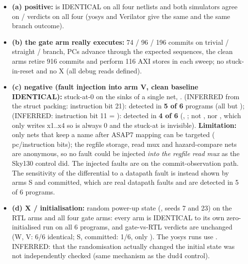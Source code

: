 \begin{record}

\begin{itemize}
\tightlist
\item
  \textbf{(a) positive:}  is IDENTICAL on all four
  netlists and both simulators agree on
  / verdicts on all four (yosys
   and Verilator give the same  and the same branch
  outcome).
\item
  \textbf{(b) the gate arm really executes:} 74 / 96 / 196 commits on
  trivial / straight / branch, PCs advance through the expected
  sequences, the clean arms retire 916 commits and perform 116 AXI
  stores in each sweep; no stuck-in-reset and no X (all debug reads
  defined).
\item
  \textbf{(c) negative (fault injection into arm V, clean baseline
  IDENTICAL):} stuck-at-0 on the sinks of a single net,
  .  (INFERRED
  from the struct packing: instruction bit 21): detected in \textbf{5 of
  6} programs (all but ); 
  (INFERRED: instruction bit 11 = ): detected in \textbf{4
  of 6} (, ; not , nor
  , which only writes x1..x4 so  is
  always 0 and the stuck-at is invisible). \textbf{Limitation:} only
  nets that keep a name after ASAP7 mapping can be targeted
  ( pc/\allowbreak{}instruction bits); the regfile
  storage, read mux and hazard-compare nets are anonymous, so no fault
  could be injected \emph{into the regfile read mux} as the Sky130
  control did. The injected faults are on the commit-observation path.
  The sensitivity of the differential to a datapath fault is instead
  shown by arms S and committed, which are real datapath faults and are
  detected in 5 of 6 programs.
\item
  \textbf{(d) X / initialisation:} random power-up state
  (, seeds 7 and 23) on the RTL arms and
  all four gate arms: every arm is IDENTICAL to its own zero-initialised
  run on all 6 programs, and gate-vs-RTL verdicts are unchanged (W, V:
  6/6 identical; S, committed: 1/6, only ). The yosys runs
  use . INFERRED: that the randomisation actually changed
  the initial state was not independently checked (same mechanism as the
  dud4 control).
\end{itemize}

\end{record}

